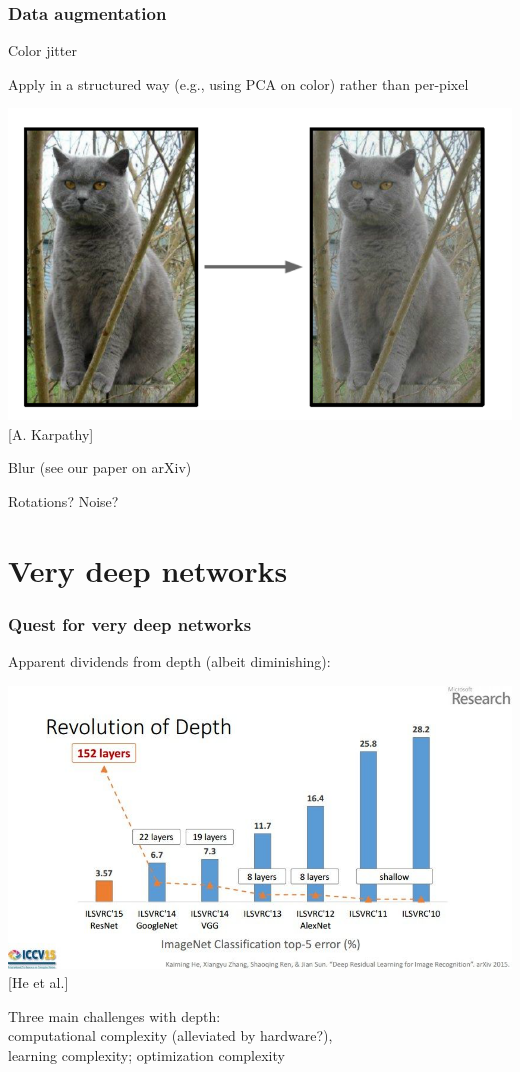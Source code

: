 \documentclass[xcolor=dvipsnames]{beamer}
\begin{document}
\begin{frame}
  \frametitle{Data augmentation}
  \bi
\item Color jitter
\ei
\begin{minipage}[c]{.6\linewidth}
  \bi
\item Apply in a structured way (e.g., using PCA on color) rather than
per-pixel
\ei
\end{minipage}%
\begin{minipage}[c]{.4\linewidth}
      \includegraphics[width=.9\textwidth]{ak-colorjitter}\\{[A. Karpathy]}
\end{minipage}
\bi
\item Blur (see our paper on arXiv)
\item Rotations? Noise?
\ei
\end{frame}

\section{Very deep networks}

\begin{frame}
  \frametitle{Quest for very deep networks}
  \bi
\item Apparent dividends from depth (albeit diminishing):

\includegraphics[width=.8\textwidth]{he-trend-slide}\\
{[He et al.]}
\item Three main challenges with depth:\\
computational complexity (alleviated by hardware?),\\
learning complexity; optimization complexity
\ei
\end{frame}
\end{document}
